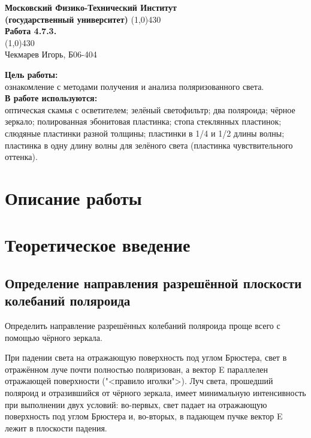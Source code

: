 \documentclass[a4paper, 12pt]{article}%
\begin{document}
\begin{titlepage}

\begin{center}
\large\textbf{Московский Физико-Технический Институт}\\
\large\textbf{(государственный университет)}
\vfill
\line(1,0){430}\\[1mm]
\huge\textbf{Работа 4.7.3.}\\
\line(1,0){430}\\[1mm]
\vfill
\large Чекмарев Игорь, Б06-404\\
\end{center}

\end{titlepage}
\noindent \textbf{Цель работы:} \\
\indent ознакомление с методами получения и анализа поляризованного света.\\
\noindent \textbf{В работе используются:} \\
\indent оптическая скамья с осветителем; зелёный светофильтр; два поляроида; чёрное зеркало; полированная эбонитовая пластинка; стопа стеклянных пластинок; слюдяные пластинки разной толщины; пластинки в 1/4 и 1/2 длины волны; пластинка в одну длину волны для зелёного света (пластинка чувствительного оттенка).

\section*{Описание работы}

\section{Теоретическое введение}
	
	\subsection{Определение направления разрешённой плоскости колебаний поляроида}
	
	Определить направление разрешённых колебаний поляроида проще всего с помощью чёрного зеркала.
	
При падении света на отражающую поверхность под углом Брюстера, свет в отражённом луче почти полностью поляризован, а вектор E
параллелен отражающей поверхности ("<правило иголки">). Луч света,
прошедший поляроид и отразившийся от чёрного зеркала, имеет минимальную интенсивность при выполнении двух условий: во-первых, свет
падает на отражающую поверхность под углом Брюстера и, во-вторых,
в падающем пучке вектор E лежит в плоскости падения.
\end{document}
